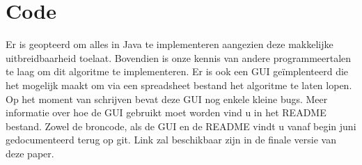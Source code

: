 \documentclass[Main.tex]{subfiles}
\begin{document}
\section{Code}
Er is geopteerd om alles in Java te implementeren aangezien deze makkelijke uitbreidbaarheid toelaat. Bovendien is onze kennis van andere programmeertalen te laag om dit algoritme te implementeren. Er is ook een GUI ge\"implenteerd die het mogelijk maakt om via een spreadsheet bestand het algoritme te laten lopen. Op het moment van schrijven bevat deze GUI nog enkele kleine bugs. Meer informatie over hoe de GUI gebruikt moet worden vind u in het README bestand. Zowel de broncode, als de GUI en de README vindt u vanaf begin juni gedocumenteerd terug op git. Link zal beschikbaar zijn in de finale versie van deze paper.
\end{document}
